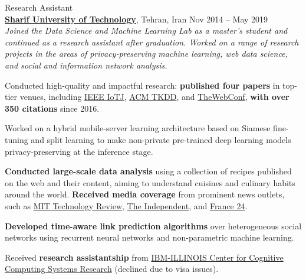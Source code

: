 \documentclass[11pt]{article}
\begin{document}
\begin{outerlist}
	\item {Research Assistant}\\
	\href{http://www.en.sharif.edu/}{\textbf{Sharif University of Technology}}, Tehran, Iran \hfill {Nov 2014 -- May 2019}\\
  \textit{Joined the {Data Science and Machine Learning Lab} as a master's student and continued as a research assistant after graduation. Worked on a range of research projects in the areas of privacy-preserving machine learning, web data science, and social and information network analysis.}

	\begin{innerlist}
    \item Conducted high-quality and impactful research: \textbf{published four papers} in top-tier venues, including \href{https://ieee-iotj.org/}{IEEE IoTJ}, \href{https://dl.acm.org/journal/tkdd}{ACM TKDD}, and \href{https://thewebconf.org/www2017/}{TheWebConf}, \textbf{with over 350 citations} since 2016.
		\item Worked on a hybrid mobile-server learning architecture based on Siamese fine-tuning and split learning to make non-private pre-trained deep learning models privacy-preserving at the inference stage.
		\item \textbf{Conducted large-scale data analysis} using a collection of recipes published on the web and their content, aiming to understand cuisines and culinary habits around the world. \textbf{Received media coverage} from prominent news outlets, such as \href{https://www.technologyreview.com/s/602790/how-data-mining-reveals-the-worlds-healthiest-cuisines/}{MIT Technology Review}, \href{https://www.indy100.com/article/healthy-diverse-top-healthiest-countries-cuisine-food-in-the-world-list-7412171}{The Independent}, and \href{https://www.france24.com/fr/20161115-algorithme-compare-cuisines-monde-matiere-dingredients-dapports-nutritionnels}{France 24}.
		\item \textbf{Developed time-aware link prediction algorithms} over heterogeneous social networks using recurrent neural networks and non-parametric machine learning.
		\item Received \textbf{research assistantship} from
    \href{https://www.c3sr.com/}{IBM-ILLINOIS Center for Cognitive Computing Systems Research} (declined due to visa issues).
	\end{innerlist}

\end{outerlist}
\end{document}
